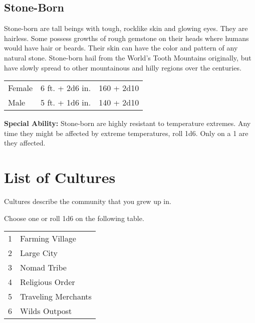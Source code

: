 \begin{multicols}{2}
\subsection{Stone-Born}

Stone-born are tall beings with tough, rocklike skin and glowing eyes. They are hairless. Some
possess growths of rough gemstone on their heads where humans would have hair or beards. Their
skin can have the color and pattern of any natural stone. Stone-born hail from
the World's Tooth Mountains originally, but have slowly spread to other mountainous and hilly
regions over the centuries.

\begin{center}
{
\begin{xtabular}{|l|l|l|}
Female & 6 ft. + 2d6 in. & 160 + 2d10 \\
Male & 5 ft. + 1d6 in. & 140 + 2d10 \\
\hline
\end{xtabular}
}
\end{center}

\textbf{Special Ability:} Stone-born are highly resistant to temperature extremes. Any time they might be affected by extreme temperatures, roll 1d6. Only on a 1 are they affected.

\section{List of Cultures}

Cultures describe the community that you grew up in. 

Choose one or roll 1d6 on the following table.

\begin{center}
{
\begin{xtabular}{|l|l|}
1 & Farming Village \\
2 & Large City \\
3 & Nomad Tribe \\
4 & Religious Order \\
5 & Traveling Merchants \\
6 & Wilds Outpost \\
\hline
\end{xtabular}
}
\end{center}


\end{multicols}

